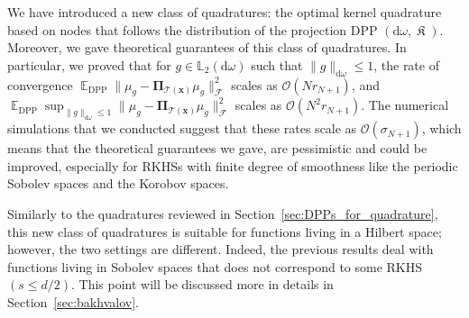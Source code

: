 \documentclass[twoside,11pt]{book}
\newtheorem{theorem}{Theorem}
\numberwithin{theorem}{chapter}
\numberwithin{definition}{chapter}
\numberwithin{proposition}{chapter}
\numberwithin{corollary}{chapter}
\numberwithin{example}{chapter}
\numberwithin{lemma}{chapter}
\numberwithin{assumption}{chapter}
\numberwithin{equation}{chapter}
\numberwithin{figure}{chapter}
\DeclareMathOperator{\DPP}{\mathrm{DPP}}
\DeclareMathOperator{\EX}{\mathbb{E}}
\DeclareMathOperator*{\KDPP}{\mathfrak{K}}
\DeclareMathOperator{\F}{\mathcal{F}}
\DeclareMathOperator{\Ns}{\mathbb{N}^{*}}
\begin{document}

We have introduced a new class of quadratures: the optimal kernel quadrature based on nodes that follows the distribution of the projection DPP $(\mathrm{d}\omega, \KDPP)$. Moreover, we gave theoretical guarantees of this class of quadratures. In particular, we proved that for $g \in \mathbb{L}_{2}(\mathrm{d}\omega)$ such that $\|g\|_{\mathrm{d}\omega} \leq 1$, the rate of convergence $\EX_{\DPP} \|\mu_{g} - \bm{\Pi}_{\mathcal{T}(\bm{x})} \mu_{g}\|_{\F}^{2}$ scales as $\mathcal{O}(Nr_{N+1})$, and $\EX_{\DPP} \sup_{\|g\|_{\mathrm{d}\omega} \leq 1}\|\mu_{g} - \bm{\Pi}_{\mathcal{T}(\bm{x})} \mu_{g}\|_{\F}^{2}$ scales as $\mathcal{O}(N^{2}r_{N+1})$. The numerical simulations that we conducted suggest that these rates scale as $\mathcal{O}(\sigma_{N+1})$, which means that the theoretical guarantees we gave, are pessimistic and could be improved, especially for RKHSs with finite degree of smoothness like the periodic Sobolev spaces and the Korobov spaces.

Similarly to the quadratures reviewed in Section~\ref{sec:DPPs_for_quadrature}, this new class of quadratures is suitable for functions living in a Hilbert space; however, the two settings are different. Indeed, the previous results deal with functions living in Sobolev spaces that does not correspond to some RKHS $(s \leq d/2)$. This point will be discussed more in details in Section~\ref{sec:bakhvalov}. 
\end{document}
